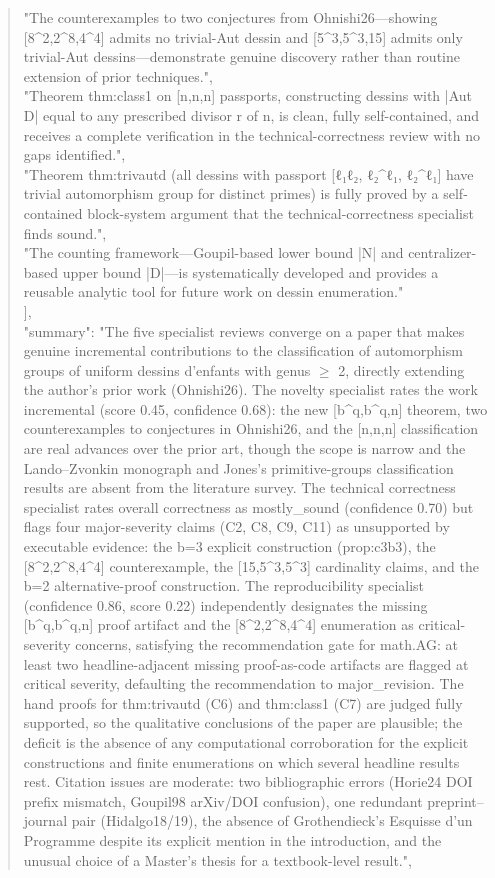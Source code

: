\documentclass[11pt]{article}
\begin{document}
\begin{quote}
    "The counterexamples to two conjectures from Ohnishi26---showing [8\^{}2,2\^{}8,4\^{}4] admits no trivial-Aut dessin and [5\^{}3,5\^{}3,15] admits only trivial-Aut dessins---demonstrate genuine discovery rather than routine extension of prior techniques.",\\
    "Theorem thm:class1 on [n,n,n] passports, constructing dessins with |Aut D| equal to any prescribed divisor r of n, is clean, fully self-contained, and receives a complete verification in the technical-correctness review with no gaps identified.",\\
    "Theorem thm:trivautd (all dessins with passport [ℓ₁ℓ₂, ℓ₂\^{}ℓ₁, ℓ₂\^{}ℓ₁] have trivial automorphism group for distinct primes) is fully proved by a self-contained block-system argument that the technical-correctness specialist finds sound.",\\
    "The counting framework---Goupil-based lower bound |N| and centralizer-based upper bound |D|---is systematically developed and provides a reusable analytic tool for future work on dessin enumeration."\\
  ],\\
  "summary": "The five specialist reviews converge on a paper that makes genuine incremental contributions to the classification of automorphism groups of uniform dessins d'enfants with genus \ensuremath{\ge} 2, directly extending the author's prior work (Ohnishi26). The novelty specialist rates the work incremental (score 0.45, confidence 0.68): the new [b\^{}q,b\^{}q,n] theorem, two counterexamples to conjectures in Ohnishi26, and the [n,n,n] classification are real advances over the prior art, though the scope is narrow and the Lando--Zvonkin monograph and Jones's primitive-groups classification results are absent from the literature survey. The technical correctness specialist rates overall correctness as mostly\_sound (confidence 0.70) but flags four major-severity claims (C2, C8, C9, C11) as unsupported by executable evidence: the b=3 explicit construction (prop:c3b3), the [8\^{}2,2\^{}8,4\^{}4] counterexample, the [15,5\^{}3,5\^{}3] cardinality claims, and the b=2 alternative-proof construction. The reproducibility specialist (confidence 0.86, score 0.22) independently designates the missing [b\^{}q,b\^{}q,n] proof artifact and the [8\^{}2,2\^{}8,4\^{}4] enumeration as critical-severity concerns, satisfying the recommendation gate for math.AG: at least two headline-adjacent missing proof-as-code artifacts are flagged at critical severity, defaulting the recommendation to major\_revision. The hand proofs for thm:trivautd (C6) and thm:class1 (C7) are judged fully supported, so the qualitative conclusions of the paper are plausible; the deficit is the absence of any computational corroboration for the explicit constructions and finite enumerations on which several headline results rest. Citation issues are moderate: two bibliographic errors (Horie24 DOI prefix mismatch, Goupil98 arXiv/DOI confusion), one redundant preprint--journal pair (Hidalgo18/19), the absence of Grothendieck's Esquisse d'un Programme despite its explicit mention in the introduction, and the unusual choice of a Master's thesis for a textbook-level result.",\\

\end{quote}
\end{document}
